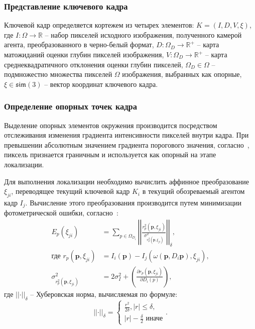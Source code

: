 \subsubsection{Представление ключевого кадра}
Ключевой кадр определяется кортежем из четырех элементов: $K = (I, D, V, \xi)$, где $I: \Omega \rightarrow \mathbb{R}$ -- набор пикселей исходного изображения, полученного камерой агента, преобразованного в черно-белый формат, $D: \Omega_D \rightarrow \mathbb{R}^+$ -- карта матожиданий оценки глубин пикселей изображения, $V: \Omega_D \rightarrow \mathbb{R}^+$ -- карта среднеквадратичного отклонения оценки глубин пикселей, $\Omega_D \in \Omega$ -- подмножестно множества пикселей $\Omega$ изображения, выбранных как опорные, $\xi \in \mathfrak{sim}(3)$ -- вектор координат ключевого кадра.


\subsubsection{Определение опорных точек кадра}
Выделение опорных элементов окружения производится посредством отслеживания изменения градиента интенсивности пикселей внутри кадра. При превышении абсолютным значением градиента порогового значения, согласно~\cite{tum3DMonoSLAM}, пиксель признается граничным и используется как опорный на этапе локализации.


Для выполнения локализации необходимо вычислить аффинное преобразование $\xi_{ji}$, переводящее текущий ключевой кадр $K_i$ в текущий обозреваемый агентом кадр $I_j$. Вычисление этого преобразования производится путем минимизации фотометрической ошибки, согласно~\cite{tum3DMonoSLAM}:
\begin{equation*}
    \begin{align*}
        E_p(\xi_{ji}) &= \sum \limits_{p \in \Omega_{D_i}} \left|\left| \frac{r^2_p(\mathbf{p}, {\xi_{ji}})}{\sigma^2_{r_p^2(\mathbf{p}, {\xi_{ji}})}} \right|\right|_\delta, \\
        \text{где~} r_p(\mathbf{p}, {\xi_{ji}}) &= I_i(\mathbf{p}) - I_j(\omega(\mathbf{p}, D_i{\mathbf{p}}), {\xi_{ji}}), \\
        \sigma^2_{r_p^2(\mathbf{p}, {\xi_{ji}})} &= 2\sigma^2_I + \left( \frac{\partial r_p(\mathbf{p}, {\xi_{ji}})}{\partial D_i(p)} \right),
    \end{align*}
\end{equation*}
где $\left|\left| \cdot \right|\right|_\delta$ -- Хуберовская норма, вычисляемая по формуле:
\begin{equation*}
    \left|\left| \cdot \right|\right|_\delta = \left\{ \begin{array}{ll}
                                                            \frac{r^2}{2\delta}, |r| \le \delta, \\
                                                            |r| - \frac{\delta}{2} \text{~иначе}
                                                        \end{array}
                                                \right. .
\end{equation*}


